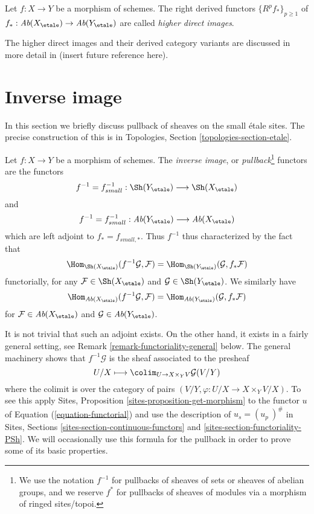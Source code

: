 \begin{definition}
\label{definition-higher-direct-images}
Let $f: X \to Y$ be a morphism of schemes.
The right derived functors $\{R^pf_*\}_{p \geq 1}$ of
$f_* : \textit{Ab}(X_\etale) \to \textit{Ab}(Y_\etale)$
are called {\it higher direct images}.
\end{definition}

\noindent
The higher direct images and their derived category variants are
discussed in more detail in (insert future reference here).



\section{Inverse image}
\label{section-inverse-image}

\noindent
In this section we briefly discuss pullback of sheaves on the small
\'etale sites. The precise construction of this is in
Topologies, Section \ref{topologies-section-etale}.

\begin{definition}
\label{definition-inverse-image}
Let $f: X\to Y$ be a morphism of schemes. The {\it inverse image}, or
{\it pullback}\footnote{We use the notation $f^{-1}$ for pullbacks of
sheaves of sets or sheaves of abelian groups, and we reserve $f^*$ for
pullbacks of sheaves of modules via a morphism of ringed sites/topoi.}
functors are the functors
$$
f^{-1} = f_{small}^{-1} :
\Sh(Y_\etale)
\longrightarrow
\Sh(X_\etale)
$$
and
$$
f^{-1} = f_{small}^{-1} :
\textit{Ab}(Y_\etale)
\longrightarrow
\textit{Ab}(X_\etale)
$$
which are left adjoint to $f_* = f_{small, *}$. Thus
$f^{-1}$ thus characterized by the fact that
$$
\Hom_{{\Sh(X_\etale)}} (f^{-1}\mathcal{G}, \mathcal{F})
=
\Hom_{\Sh(Y_\etale)} (\mathcal{G}, f_*\mathcal{F})
$$
functorially, for any $\mathcal{F} \in \Sh(X_\etale)$ and
$\mathcal{G} \in \Sh(Y_\etale)$. We similarly have
$$
\Hom_{{\textit{Ab}(X_\etale)}} (f^{-1}\mathcal{G}, \mathcal{F})
=
\Hom_{\textit{Ab}(Y_\etale)} (\mathcal{G}, f_*\mathcal{F})
$$
for $\mathcal{F} \in \textit{Ab}(X_\etale)$ and
$\mathcal{G} \in \textit{Ab}(Y_\etale)$.
\end{definition}

\noindent
It is not trivial that such an adjoint exists.
On the other hand, it exists in a fairly general setting, see
Remark \ref{remark-functoriality-general}
below. The general machinery shows that $f^{-1}\mathcal{G}$
is the sheaf associated to the presheaf
\begin{equation}
\label{equation-pullback}
U/X
\longmapsto
\colim_{U \to X \times_Y V} \mathcal{G}(V/Y)
\end{equation}
where the colimit is over the category of pairs
$(V/Y, \varphi : U/X \to X \times_Y V/X)$.
To see this apply
Sites, Proposition \ref{sites-proposition-get-morphism}
to the functor $u$ of Equation (\ref{equation-functorial})
and use the description of $u_s = (u_p\ )^\#$ in
Sites, Sections \ref{sites-section-continuous-functors} and
\ref{sites-section-functoriality-PSh}.
We will occasionally use this formula for the pullback
in order to prove some of its basic properties.

